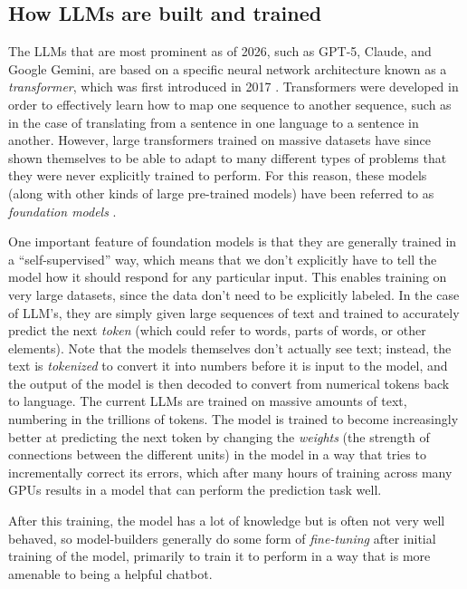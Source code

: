 \subsection{How LLMs are built and trained}

The LLMs that are most prominent as of 2026, such as GPT-5, Claude, and Google Gemini, are based on a specific neural network architecture known as a \textit{transformer}, which was first introduced in 2017 \citep{Vaswani:2017aa}.
Transformers were developed in order to effectively learn how to map one sequence to another sequence, such as in the case of translating from a sentence in one language to a sentence in another.
However, large transformers trained on massive datasets have since shown themselves to be able to adapt to many different types of problems that they were never explicitly trained to perform.
For this reason, these models (along with other kinds of large pre-trained models) have been referred to as \textit{foundation models} \citep{Bommasani:2022aa}.

One important feature of foundation models is that they are generally trained in a ``self-supervised'' way, which means that we don't explicitly have to tell the model how it should respond for any particular input.
This enables training on very large datasets, since the data don't need to be explicitly labeled.
In the case of LLM's, they are simply given large sequences of text and trained to accurately predict the next \textit{token} (which could refer to words, parts of words, or other elements).
Note that the models themselves don't actually see text; instead, the text is \textit{tokenized} to convert it into numbers before it is input to the model, and the output of the model is then decoded to convert from numerical tokens back to language.
The current LLMs are trained on massive amounts of text, numbering in the trillions of tokens.
The model is trained to become increasingly better at predicting the next token by changing the \textit{weights} (the strength of connections between the different units) in the model in a way that tries to incrementally correct its errors, which after many hours of training across many GPUs results in a model that can perform the prediction task well.

After this training, the model has a lot of knowledge but is often not very well behaved, so model-builders generally do some form of \textit{fine-tuning} after initial training of the model, primarily to train it to perform in a way that is more amenable to being a helpful chatbot.

